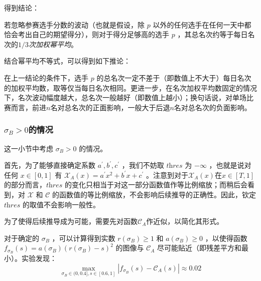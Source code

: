             得到结论：

            \begin{tcolorbox}[colback=white,colframe=black,boxrule=0.5pt,arc=0pt]
                若忽略参赛选手分数的波动（也就是假设，除 $p$ 以外的任何选手在任何一天中都恰会考出自己的期望得分），则对于得分足够高的选手 $p$ ，其总名次约等于每日名次的\emph{$1/3$次加权幂平均}。
            \end{tcolorbox}

            结合幂平均不等式\cite{wiki_powerMean}，可以得到如下推论：
            
            \begin{tcolorbox}[colback=white,colframe=black,boxrule=0.5pt,arc=0pt]
                在上一结论的条件下，选手 $p$ 的总名次一定不差于（即数值上不大于）每日名次的加权平均数，取等仅当每日名次相同。更进一步，在名次加权平均数固定的情况下，名次波动幅度越大，总名次一般越好（即数值上越小）；换句话说，对单场比赛而言，前进$n$名对总名次的正面影响，一般大于后退$n$名对总名次的负面影响。
            \end{tcolorbox}

        \subsubsection{$\sigma_B>0$的情况}

            这一小节中考虑 $\sigma_B>0$ 的情况。

            \vspace{1.5ex}
            
            首先，为了能够直接确定系数 $a^\prime,b^\prime,c^\prime$ ，我们不妨取 $\textit{thres}$ 为 $-\infty$ ，也就是说对任何 $x\in [0,1]$ 有 $\mathcal{X}_A(x)=a^\prime x^2+b^\prime x+c^\prime$ 。注意到对于$\mathcal{X}_A(x)$在$x\in [T,1]$的部分而言，$\textit{thres}$ 的变化只相当于对这一部分函数值作等比例缩放；而稍后会看到，对 $\mathcal{X}$ 和 $\mathcal{C}$ 的函数值的等比例缩放，不会影响后续推导的正确性。因此，钦定 $\textit{thres}$ 的取值不会影响一般性。

            \vspace{1.5ex}

            为了使得后续推导成为可能，需要先对函数$\mathcal{C}_A$作近似，以简化其形式。

            对于确定的 $\sigma_B$ ，可以计算得到实数 $r(\sigma_B)\geq 1$ 和 $a(\sigma_B)\geq 0$ ，以使得函数 $f_{\sigma_B}(s)=a(\sigma_B)(r(\sigma_B)-s)^2$ 的图像与 $\mathcal{C}_A$ 尽可能贴近（即残差平方和最小）。实验发现：
            $$
            \max\limits_{\sigma_B\in (0,0.4],s\in [0.6,1]} \left|f_{\sigma_B}(s)-\mathcal{C}_A(s)\right|\approx 0.02
            $$

